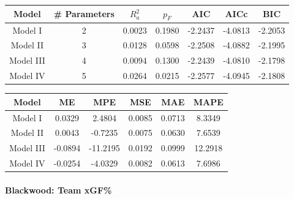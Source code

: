 \documentclass[
  10pt,
]{extarticle}
\begin{document}
\begin{center}
\normalsize

\begin{tabular}{ccccccc}
\toprule
Model & \# Parameters & $R_a^2$ & $p_F$ & AIC & AICc & BIC\\
\midrule
Model I & 2 & 0.0023 & 0.1980 & -2.2437 & -4.0813 & -2.2053\\
Model II & 3 & 0.0128 & 0.0598 & -2.2508 & -4.0882 & -2.1995\\
Model III & 4 & 0.0094 & 0.1300 & -2.2439 & -4.0810 & -2.1798\\
Model IV & 5 & 0.0264 & 0.0215 & -2.2577 & -4.0945 & -2.1808\\
\bottomrule
\end{tabular}
\normalsize
\end{center}
\begin{center}
\normalsize

\begin{tabular}{cccccc}
\toprule
Model & ME & MPE & MSE & MAE & MAPE\\
\midrule
Model I & 0.0329 & 2.4804 & 0.0085 & 0.0713 & 8.3349\\
Model II & 0.0043 & -0.7235 & 0.0075 & 0.0630 & 7.6539\\
Model III & -0.0894 & -11.2195 & 0.0192 & 0.0999 & 12.2918\\
Model IV & -0.0254 & -4.0329 & 0.0082 & 0.0613 & 7.6986\\
\bottomrule
\end{tabular}
\normalsize
\end{center}

\paragraph{Blackwood: Team xGF\%}\label{blackwood-team-xgf}
\end{document}
